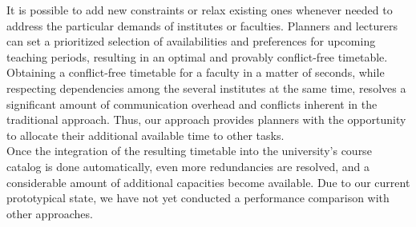 \documentclass{easychair}
\begin{document}
  It is possible to add new constraints or relax existing ones whenever needed to address the particular demands of institutes or faculties. 
  Planners and lecturers can set a prioritized selection of availabilities and preferences for upcoming teaching periods, resulting in an optimal and provably conflict-free timetable.
  Obtaining a conflict-free timetable for a faculty in a matter of seconds, while respecting dependencies among the several institutes at the same time, resolves a significant amount of communication overhead and conflicts inherent in the traditional approach. 
  Thus, our approach provides planners with the opportunity to allocate their additional available time to other tasks. \\
  Once the integration of the resulting timetable into the university's course catalog is done automatically, even more redundancies are resolved, and a considerable amount of additional capacities become available. 
  Due to our current prototypical state, we have not yet conducted a performance comparison with other approaches\cite{feutrier23a}. 




\end{document}
